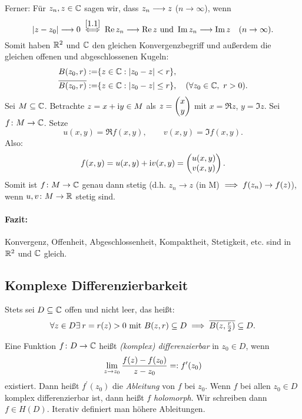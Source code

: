 \documentclass[a4paper,twoside,DIV15,BCOR12mm]{scrbook}
\begin{document}
\begin{center}
\end{center}

Ferner: Für $z_n,z\in\mathbb{C}$ sagen wir, dass $z_n\longrightarrow z$ ($n\to\infty$), wenn
\[\left\lvert z-z_0\right\lvert\longrightarrow 0\overset{\eqref{1.1}}{\iff} \operatorname{Re}{z_n}\longrightarrow\operatorname{Re}{z}\text{ und }\operatorname{Im}{z_n}\longrightarrow\operatorname{Im}{z}\quad(n\to\infty).\]
Somit haben $\mathbb{R}^2$ und $\mathbb{C}$ den gleichen Konvergenzbegriff und außerdem die gleichen offenen und abgeschlossenen Kugeln:
\begin{align*}
B(z_0,r):=&\{z\in\mathbb{C}: \left\lvert z_0-z\right\lvert < r\},\\
\overline{B(z_0,r)}:=&\{z\in\mathbb{C}: \left\lvert z_0-z\right\lvert \leq r\},\quad(\forall z_0\in\mathbb{C},\ r>0).
\end{align*}
Sei $M\subseteq\mathbb{C}$. Betrachte $z=x+\mathrm{i} y\in M$ als $z = \left(\!\!\!\begin{array}{c}x\\y\end{array}\!\!\!\right)$ mit $x = \Re{z}$, $y = \Im{z}$. Sei $f\colon M\to\mathbb{C}$. Setze
\[u(x,y) = \Re{f(x,y)},\qquad v(x,y) = \Im{f(x,y)}.\]
Also:
\[f(x,y) = u(x,y) + \mathrm{i} v(x,y) = \left(\!\!\!\begin{array}{c}u(x,y)\\v(x,y)\end{array}\!\!\!\right).\]
Somit ist $f\colon M\to\mathbb{C}$ genau dann stetig (d.h. $z_n\to z$ (in M) $\implies f(z_n)\to f(z)$), wenn $u,v\colon M\to\mathbb{R}$ stetig sind.

\paragraph{Fazit:} Konvergenz, Offenheit, Abgeschlossenheit, Kompaktheit, Stetigkeit, etc. sind in $\mathbb{R}^2$ und $\mathbb{C}$ gleich.

\subsection{Komplexe Differenzierbarkeit}

Stets sei $D\subseteq\mathbb{C}$ offen und nicht leer, das heißt:
\[\forall z\in D\exists\: r = r(z)>0\text{ mit }B(z,r)\subseteq D\implies\overline{B(z,\tfrac{r}{2})}\subseteq D.\]

\begin{dfn} \label{dfn1.1}
  Eine Funktion $f\colon D \to \mathbb{C}$ heißt \emph{(komplex) differenzierbar} in $z_0 \in D$, wenn
  \[\lim_{z\to z_0}{\frac{f(z)-f(z_0)}{z-z_0}} =: f^\prime(z_0)\]
  existiert. Dann heißt $f^\prime(z_0)$ die \emph{Ableitung} von $f$ bei $z_0$. Wenn $f$ bei allen $z_0\in D$ komplex
  differenzierbar ist, dann heißt $f$ \emph{holomorph}. Wir schreiben dann $f\in H(D)$. Iterativ definiert man höhere
  Ableitungen.
\end{dfn}
\end{document}
